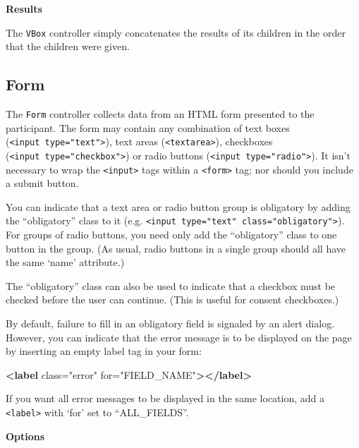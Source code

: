 \documentclass[]{article}
\newenvironment{Shaded}{}{}
\newcommand{\KeywordTok}[1]{\textcolor[rgb]{0.00,0.44,0.13}{\textbf{{#1}}}}
\newcommand{\StringTok}[1]{\textcolor[rgb]{0.25,0.44,0.63}{{#1}}}
\newcommand{\OtherTok}[1]{\textcolor[rgb]{0.00,0.44,0.13}{{#1}}}
\begin{document}
\textbf{Results}

The \texttt{VBox} controller simply concatenates the results of its
children in the order that the children were given.

\subsection{Form}\label{form}

The \texttt{Form} controller collects data from an HTML form presented
to the participant. The form may contain any combination of text boxes
(\texttt{\textless{}input\ type="text"\textgreater{}}), text areas
(\texttt{\textless{}textarea\textgreater{}}), checkboxes
(\texttt{\textless{}input\ type="checkbox"\textgreater{}}) or radio
buttons (\texttt{\textless{}input\ type="radio"\textgreater{}}). It
isn't necessary to wrap the \texttt{\textless{}input\textgreater{}} tags
within a \texttt{\textless{}form\textgreater{}} tag; nor should you
include a submit button.

You can indicate that a text area or radio button group is obligatory by
adding the ``obligatory'' class to it (e.g.
\texttt{\textless{}input\ type="text"\ class="obligatory"\textgreater{}}).
For groups of radio buttons, you need only add the ``obligatory'' class
to one button in the group. (As usual, radio buttons in a single group
should all have the same `name' attribute.)

The ``obligatory'' class can also be used to indicate that a checkbox
must be checked before the user can continue. (This is useful for
consent checkboxes.)

By default, failure to fill in an obligatory field is signaled by an
alert dialog. However, you can indicate that the error message is to be
displayed on the page by inserting an empty label tag in your form:

\begin{Shaded}
\begin{Highlighting}[]
    \KeywordTok{<label}\OtherTok{ class=}\StringTok{"error"}\OtherTok{ for=}\StringTok{"FIELD_NAME"}\KeywordTok{></label>}
\end{Highlighting}
\end{Shaded}

If you want all error messages to be displayed in the same location, add
a \texttt{\textless{}label\textgreater{}} with `for' set to
``ALL\_FIELDS''.

\textbf{Options}
\end{document}
